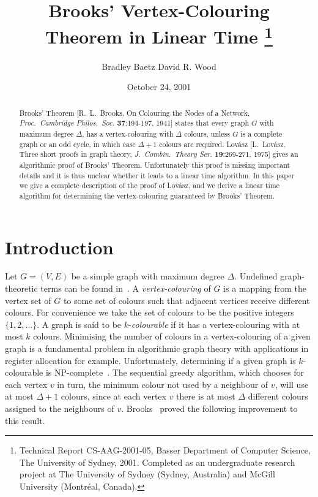 \documentclass{article}
\begin{document}
\date{October 24, 2001}

\title{\textbf{Brooks' Vertex-Colouring\\ Theorem in Linear Time} \thanks{Technical Report CS-AAG-2001-05, Basser Department of Computer Science, The University of Sydney, 2001. Completed as an undergraduate research project at The University of Sydney (Sydney, Australia)  and McGill University (Montr\'eal, Canada).}}


\author{Bradley Baetz \qquad David R. Wood\footnotemark[2]}



\maketitle

\begin{abstract} Brooks' Theorem  [R.\ L.\ Brooks, On Colouring the Nodes of a
Network, \emph{Proc.\ Cambridge Philos.\ Soc.} \textbf{37}:194-197, 1941]
states that every graph $G$ with maximum degree $\Delta$, has a
vertex-colouring with $\Delta$ colours, unless $G$ is a complete graph or an
odd cycle, in which case $\Delta+1$ colours are required. Lov{\'a}sz [L.\
Lov{\'a}sz, Three short proofs in graph theory, \emph{J.\ Combin.\ Theory Ser.}
\textbf{19}:269-271, 1975] gives an algorithmic proof of Brooks' Theorem. 
Unfortunately this proof is missing important details and it is thus unclear
whether it leads to a linear time algorithm. In this paper we give a complete
description of the proof of Lov{\'a}sz, and we derive a linear time algorithm
for determining the vertex-colouring guaranteed by Brooks' Theorem. 
\end{abstract}



\section{Introduction}

Let $G=(V,E)$ be a simple graph with maximum degree $\Delta$. Undefined
graph-theoretic terms can be found in~\cite{CL96}. A \emph{vertex-colouring} of
$G$ is a mapping from the vertex set of $G$ to some set of colours such that
adjacent vertices receive different colours. For convenience we take the set of
colours to be the positive integers $\{1,2,\dots\}$. A graph is said to be
$k$-\emph{colourable} if it has a vertex-colouring with at most $k$ colours.
Minimising the number of colours in a vertex-colouring of a given graph is a
fundamental problem in algorithmic graph theory with applications in register
allocation for example. Unfortunately, determining if a given graph is
$k$-colourable is NP-complete~\cite{Karp72}. The sequential greedy algorithm,
which chooses for each vertex $v$ in turn, the minimum colour not used by a
neighbour of $v$, will use at most $\Delta+1$ colours, since at each vertex $v$
there is at most $\Delta$ different colours assigned to the neighbours of $v$.
Brooks~\cite{Brooks41} proved the following improvement to this result.
\end{document}
